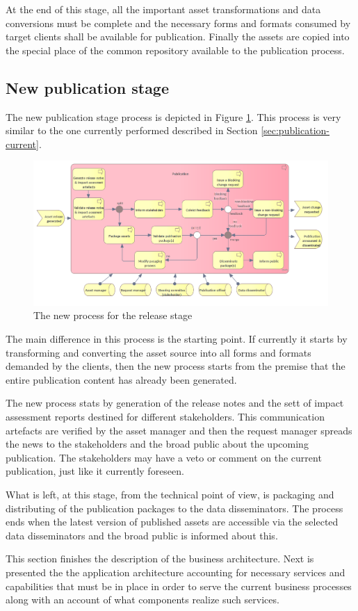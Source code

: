 	At the end of this stage, all the important asset transformations and data conversions must be complete and the necessary forms and formats consumed by target clients shall be available for publication. Finally the assets are copied into the special place of the common repository available to the publication process. 
	
	\subsection{New publication stage}
	\label{sec:publication-new}
	
	The new publication stage process is depicted in Figure \ref{fig:publication-new}. This process is very similar to the one currently performed described in Section \ref{sec:publication-current}.
	
	\begin{figure}[h]
		\centering
		\includegraphics[width=1.05\textwidth]{images/business/new/Publication.png}
		\caption{The new process for the release stage}
		\label{fig:publication-new}
	\end{figure}

	The main difference in this process is the starting point. If currently it starts by transforming and converting the asset source into all forms and formats demanded by the clients, then the new process starts from the premise that the entire publication content has already been generated. 
	
	The new process stats by generation of the release notes and the sett of impact assessment reports destined for different stakeholders. This communication artefacts are verified by the asset manager and then the request manager spreads the news to the stakeholders and the broad public about the upcoming publication. The stakeholders may have a veto or comment on the current publication, just like it currently foreseen.   
	
	What is left, at this stage, from the technical point of view, is packaging and distributing of the publication packages to the data disseminators. The process ends when the latest version of published assets are accessible via the selected data disseminators and the broad public is informed about this. 
	
	This section finishes the description of the business architecture. Next is presented the the application architecture accounting for necessary services and capabilities that must be in place in order to serve the current business processes along with an account of what components realize such services. 
	